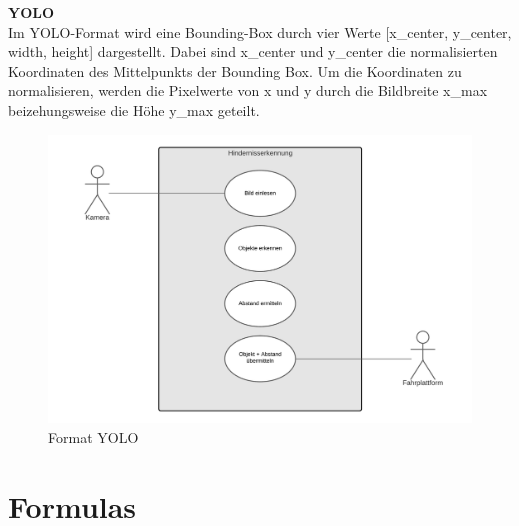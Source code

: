 \begin{minipage}[h]{0.5\textwidth}
	\textbf{YOLO}\\
	Im YOLO-Format wird eine Bounding-Box durch vier Werte [x\_center, y\_center, width, height] dargestellt. Dabei sind x\_center und y\_center die normalisierten Koordinaten des Mittelpunkts der Bounding Box. Um die Koordinaten zu normalisieren, werden die Pixelwerte von x und y durch die Bildbreite x\_max beizehungsweise die Höhe y\_max geteilt.
	\vspace{1mm}
	
\end{minipage}
\begin{minipage}[h]{0.5\textwidth}
	
	\begin{figure}[H]
		\centering
		\includegraphics[width=1\textwidth]{chapters/cheatsheet/images/UseCaseNeu.png}
		\caption[Format YOLO - Eigene Darstellung]{Format YOLO}
		\label{fig:format2}
	\end{figure}
	\vspace{1mm}
\end{minipage}
\vspace{1mm}

\section{Formulas}

